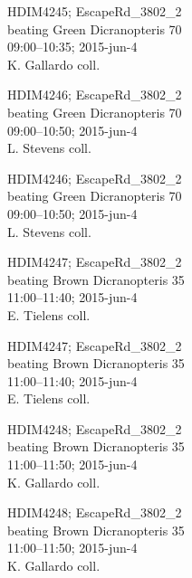 \documentclass[6pt]{article}
\begin{document}
\noindent
\parbox{0.135\textwidth}{\tiny HDIM4245; EscapeRd\_3802\_2\\ beating Green Dicranopteris 70\\ 09:00--10:35; 2015-jun-4\\ K. Gallardo coll.}
\parbox{0.135\textwidth}{\tiny HDIM4246; EscapeRd\_3802\_2\\ beating Green Dicranopteris 70\\ 09:00--10:50; 2015-jun-4\\ L. Stevens coll.}
\parbox{0.135\textwidth}{\tiny HDIM4246; EscapeRd\_3802\_2\\ beating Green Dicranopteris 70\\ 09:00--10:50; 2015-jun-4\\ L. Stevens coll.}
\parbox{0.135\textwidth}{\tiny HDIM4247; EscapeRd\_3802\_2\\ beating Brown Dicranopteris 35\\ 11:00--11:40; 2015-jun-4\\ E. Tielens coll.}
\parbox{0.135\textwidth}{\tiny HDIM4247; EscapeRd\_3802\_2\\ beating Brown Dicranopteris 35\\ 11:00--11:40; 2015-jun-4\\ E. Tielens coll.}
\parbox{0.135\textwidth}{\tiny HDIM4248; EscapeRd\_3802\_2\\ beating Brown Dicranopteris 35\\ 11:00--11:50; 2015-jun-4\\ K. Gallardo coll.}
\parbox{0.135\textwidth}{\tiny HDIM4248; EscapeRd\_3802\_2\\ beating Brown Dicranopteris 35\\ 11:00--11:50; 2015-jun-4\\ K. Gallardo coll.} \\ 
\vspace{0.001in} 
\end{document}

